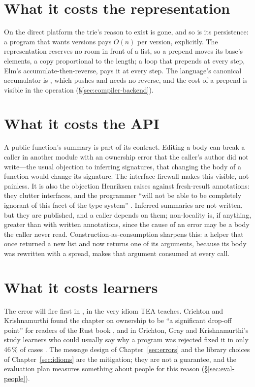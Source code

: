 \section{What it costs the representation}

On the direct platform the trie's reason to exist is gone, and so is its persistence: a program that wants versions pays
$O(n)$ per version, explicitly. The representation reserves no room in front of a list, so a prepend
moves its base's elements, a copy proportional to the length; a loop that prepends at every step, Elm's
accumulate-then-reverse, pays it at every step. The language's canonical accumulator is
\code{[ …acc, x ]}, which pushes and needs no reverse, and the cost of a prepend is visible in the operation
(\S\ref{sec:compiler-backend}).

\section{What it costs the API}

A public function's summary is part of its contract. Editing a body can break a caller in another
module with an ownership error that the caller's author did not write---the usual objection to
inferring signatures, that changing the body of a function would change its signature. The interface
firewall makes this visible, not painless. It is also the objection Henriksen raises against
fresh-result annotations: they clutter interfaces, and the programmer ``will not be able to be
completely ignorant of this facet of the type system'' \citep{henriksen2026aliasing}. Inferred summaries
are not written, but they are published, and a caller depends on them; non-locality is, if anything,
greater than with written annotations, since the cause of an error may be a body the caller never
read. Construction-as-consumption sharpens this: a helper that once returned a new list and now returns
one of its arguments, because its body was rewritten with a spread, makes that argument consumed at
every call.

\section{What it costs learners}

The error will fire first in , in the very idiom TEA teaches. Crichton and Krishnamurthi
found the chapter on ownership to be ``a significant drop-off point'' for readers of the Rust book
\citep[\S3.1]{crichton2024profiling}, and in Crichton, Gray and Krishnamurthi's study learners who could
usually say why a program was rejected fixed it in only 46\,\% of cases \citep[\S2.4]{crichton2023grounded}.
The message design of Chapter~\ref{sec:errors} and the library choices of Chapter~\ref{sec:idioms} are
the mitigation; they are not a guarantee, and the evaluation plan measures something about people for
this reason (\S\ref{sec:eval-people}).

